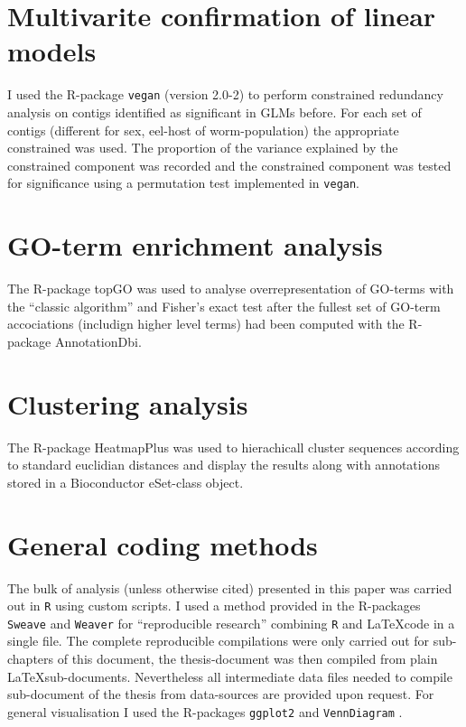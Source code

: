 \section{Multivarite confirmation of linear models}
\label{sec:mult-conf-line}

I used the R-package \texttt{vegan} (version 2.0-2) to perform
constrained redundancy analysis on contigs identified as significant
in GLMs before. For each set of contigs (different for sex, eel-host
of worm-population) the appropriate constrained was used. The
proportion of the variance explained by the constrained component was
recorded and the constrained component was tested for significance
using a permutation test implemented in \texttt{vegan}.

\section{GO-term enrichment analysis}

The R-package topGO was used to analyse overrepresentation of GO-terms
with the ``classic algorithm'' and Fisher's exact test after the
fullest set of GO-term accociations (includign higher level terms) had
been computed with the R-package AnnotationDbi.

\section{Clustering analysis}

The R-package HeatmapPlus was used to hierachicall cluster sequences
according to standard euclidian distances and display the results
along with annotations stored in a Bioconductor eSet-class object.


\section{General coding methods}

The bulk of analysis (unless otherwise cited) presented in this paper
was carried out in \texttt{R} \cite{R_project} using custom scripts.
I used a method provided in the R-packages \texttt{Sweave}
\cite{lmucs-papers:Leisch:2002} and \texttt{Weaver} \cite{weaver} for
``reproducible research'' combining \texttt{R} and \LaTeX code in a
single file. The complete reproducible compilations were only carried
out for sub-chapters of this document, the thesis-document was then
compiled from plain \LaTeX sub-documents. Nevertheless all
intermediate data files needed to compile sub-document of the thesis
from data-sources are provided upon request. For general visualisation
I used the R-packages \texttt{ggplot2} \cite{ggplot-book} and
\texttt{VennDiagram} \cite{pmid21269502}.


 






